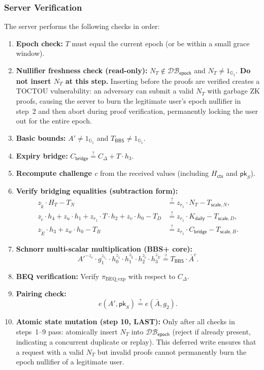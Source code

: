 \documentclass[11pt]{article}
\theoremstyle{definitionstyle}
\theoremstyle{plain}
\newcommand{\DB}{\mathcal{DB}}
\begin{document}
\subsubsection{Server Verification}
The server performs the following checks in order:
\begin{enumerate}[leftmargin=*]
\item \textbf{Epoch check:} $T$ must equal the current epoch (or be within a small grace window).
\item \textbf{Nullifier freshness check (read-only):} $N_T \notin \DB_{\mathsf{epoch}}$ and $N_T \neq 1_{\mathbb{G}_1}$. \textbf{Do not insert $N_T$ at this step.} Inserting before the proofs are verified creates a TOCTOU vulnerability: an adversary can submit a valid $N_T$ with garbage ZK proofs, causing the server to burn the legitimate user's epoch nullifier in step~2 and then abort during proof verification, permanently locking the user out for the entire epoch.
\item \textbf{Basic bounds:} $A' \neq 1_{\mathbb{G}_1}$ and $T_{\mathsf{BBS}} \neq 1_{\mathbb{G}_1}$.
\item \textbf{Expiry bridge:} $C_{\mathsf{bridge}} \stackrel{?}{=} C_{\Delta} + T \cdot h_3$.
\item \textbf{Recompute challenge $c$} from the received values (including $H_{\mathsf{ctx}}$ and $\mathsf{pk}_S$).
\item \textbf{Verify bridging equalities (subtraction form):}
  \begin{align*}
    z_{\tilde{k}} \cdot H_T - T_N &\stackrel{?}{=} z_{r_1} \cdot N_T - T_{\mathsf{scale},N}, \\
    z_{\tilde{c}} \cdot h_4 + z_u \cdot h_1 + z_{r_1} \cdot T \cdot h_2 + z_v \cdot h_0 - T_D &\stackrel{?}{=} z_{r_1} \cdot K_{\mathsf{daily}} - T_{\mathsf{scale},D}, \\
    z_{\tilde{E}} \cdot h_3 + z_w \cdot h_0 - T_B &\stackrel{?}{=} z_{r_1} \cdot C_{\mathsf{bridge}} - T_{\mathsf{scale},B}.
  \end{align*}
\item \textbf{Schnorr multi-scalar multiplication (BBS+ core):}
  \[
  A'^{-z_e} \cdot g_1^{z_{r_1}} \cdot h_0^{z_{\tilde{s}}} \cdot h_1^{z_{\tilde{k}}} \cdot h_2^{z_{\tilde{c}}} \cdot h_3^{z_{\tilde{E}}} \stackrel{?}{=} T_{\mathsf{BBS}} \cdot \bar{A}^c.
  \]
\item \textbf{BEQ verification:} Verify $\pi_{\text{BEQ\_exp}}$ with respect to $C_{\Delta}$.
\item \textbf{Pairing check:}
  \[
  e(A', \mathsf{pk}_S) \stackrel{?}{=} e(\bar{A}, g_2).
  \]
\item \textbf{Atomic state mutation (step 10, LAST):} Only after all checks in steps~1--9 pass: atomically insert $N_T$ into $\DB_{\mathsf{epoch}}$ (reject if already present, indicating a concurrent duplicate or replay). This deferred write ensures that a request with a valid $N_T$ but invalid proofs cannot permanently burn the epoch nullifier of a legitimate user.
\end{enumerate}
\end{document}
